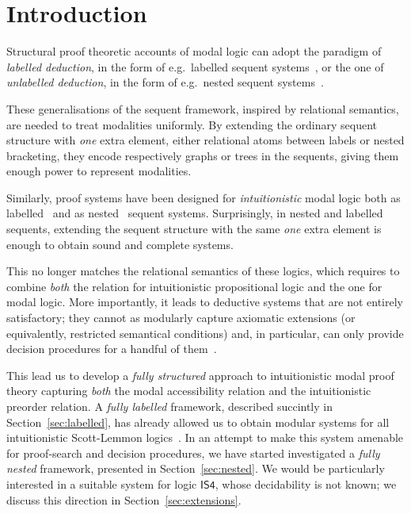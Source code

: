 \documentclass[twoside]{aiml20}
\begin{document}
\section{Introduction}
Structural proof theoretic accounts of modal logic can adopt the paradigm of \emph{labelled deduction}, in the form of e.g.~labelled sequent systems~\cite{vigano2000,negri2005}, or the one of \emph{unlabelled deduction}, in the form of e.g.~nested sequent systems~\cite{brunnler2009,poggiolesi2009}.

These generalisations of the sequent framework, inspired by relational semantics, are needed to treat modalities uniformly. 
%
By extending the ordinary sequent structure with \emph{one} extra element, either relational atoms between labels or nested bracketing, they encode respectively graphs or trees in the sequents, giving them enough power to represent modalities. 

Similarly, proof systems have been designed for \emph{intuitionistic} modal logic both as labelled~\cite{simpson1994} and as nested~\cite{strassburger2013,kuznets:strassburger:maehara,galmiche2018} sequent systems.
%
Surprisingly, in nested and labelled sequents, extending the sequent structure with the same \emph{one} extra element is enough to obtain sound and complete systems.
%

This no longer matches the relational semantics of these logics, which requires to combine \emph{both} the relation for intuitionistic propositional logic and the one for modal logic. 
%
More importantly, it leads to deductive systems that are not entirely satisfactory; they cannot as modularly capture axiomatic extensions (or equivalently, restricted semantical conditions) and, in particular, can only provide decision procedures for a handful of them~\cite{simpson1994}.

This lead us to develop a \emph{fully structured} approach to intuitionistic modal proof theory capturing \emph{both} the modal accessibility relation and the intuitionistic preorder relation. 
%
A \emph{fully labelled} framework, described succintly in Section~\ref{sec:labelled}, has already allowed us to obtain modular systems for all intuitionistic Scott-Lemmon logics~\cite{marin:morales:strassburger:hal}. 
%
In an attempt to make this system amenable for proof-search and decision procedures, we have started investigated a \emph{fully nested} framework, presented in Section~\ref{sec:nested}.
%
We would be particularly interested in a suitable system for logic $\mathsf{IS4}$, whose decidability is not known; we discuss this direction in Section~\ref{sec:extensions}.
\end{document}
